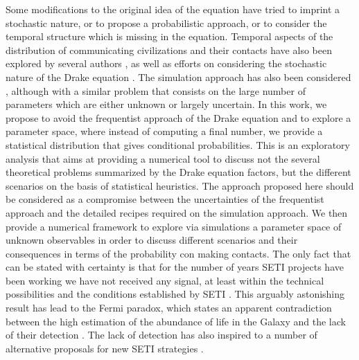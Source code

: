 Some modifications to the original idea of the equation have tried to
imprint a stochastic nature, or to propose a probabilistic approach,
or to consider the temporal structure which is missing in the
equation.
%
Temporal aspects of the distribution of communicating civilizations
and their contacts have also been explored by several authors
\citep{fogg_temporal_1987, forgan_spatiotemporal_2011,
balbi_impact_2018, balb_spatiotemporal_2018, horvat_impact_2011},
%
as well as efforts on considering the stochastic nature of the Drake
equation \citep{glade_stochastic_2011}.
%
The simulation approach has also been considered
\citep{forgan_evaluating_2015, vukotic_grandeur_2016,
murante_simulating_2015, forgan_numerical_2009, forgan_galactic_2017},
although with a similar problem that consists on the large number of
parameters which are either unknown or largely uncertain.
%
%
%
In this work, we propose to avoid the frequentist approach of the
Drake equation and to explore a parameter space, where instead of
computing a final number, we provide a statistical distribution that
gives conditional probabilities.
%
This is an exploratory analysis that aims at providing a numerical
tool to discuss not the several theoretical problems summarized by the
Drake equation factors, but the different scenarios on the basis of
statistical heuristics.
%
The approach proposed here should be considered as a compromise between
the uncertainties of the frequentist approach and the detailed recipes
required on the simulation approach.
%
We then provide a numerical framework to explore via simulations a
parameter space of unknown observables in order to discuss different
scenarios and their consequences in terms of the probability con
making contacts.
%
The only fact that can be stated with certainty is that for the number
of years SETI projects have been working we have not received any
signal, at least within the technical possibilities and the conditions
established by SETI \citep{tarter_search_2001}.
%
This arguably astonishing result has lead to the Fermi paradox, which
states an apparent contradiction between the high estimation of the
abundance of life in the Galaxy and the lack of their detection
\citep{vanhouten_isthere_2017}.
%
The lack of detection has also inspired to a number of alternative
proposals for new SETI strategies \citep{forgan_exoplanet_2017,
balbi_impact_2018, loeb_eavesdropping_2006, maccone_KLT_2010,
tarter_advancing_2009, enriquez_breakthrough_2017, loeb_relative_2016,
maccone_SETI_2011,  lingam_relative_2019, wright_theGsearch_2015,
maccone_SETI_2013, maccone_lognormals_2014, harp_application_2018,
forgan_possibility_2013, forgan_galactic_2017, funes_searching_2019}.
 


